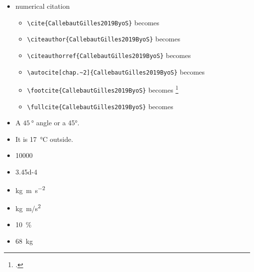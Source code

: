 \begin{itemize}
\begin{itemize}
    \item \verb!\cref{fig:example}! becomes \cref{fig:example}
    \item \verb!\cref{tab:example}! becomes \cref{tab:example}
    \item \verb!\cref{ch:introduction}! becomes \cref{ch:introduction}
    \item \cref{eq:emc2}


\end{itemize}
\item numerical citation~\cite{s19030585}
\begin{itemize}
    \item \verb!\cite{CallebautGilles2019ByoS}! becomes \cite{CallebautGilles2019ByoS}

    \item \verb!\citeauthor{CallebautGilles2019ByoS}! becomes \citeauthor{CallebautGilles2019ByoS}
    \item \verb!\citeauthorref{CallebautGilles2019ByoS}! becomes 
    \item \verb!\autocite[chap.~2]{CallebautGilles2019ByoS}! becomes \autocite[chap.~2]{CallebautGilles2019ByoS}
    \item \verb!\footcite{CallebautGilles2019ByoS}! becomes \footcite{CallebautGilles2019ByoS}
    \item \verb!\fullcite{CallebautGilles2019ByoS}! becomes 
\end{itemize}

    \item A $\SI{45}{\degree}$ angle or a \ang{45}.

    \item It is \SI{17}{\degreeCelsius} outside.

    \item  \num{10000}
    \item \num{3.45d-4}

    \item \si{\kilo\gram\meter\per\square\second} 
    \item \si{kg.m/s^2} %

    \item \SI{10}{\percent}
    \item \SI{68}{kg}
\end{itemize}


